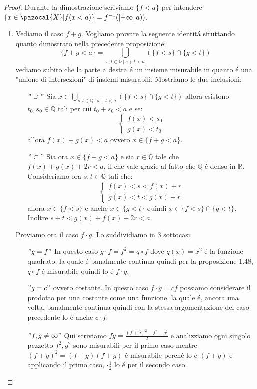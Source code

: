 \documentclass[11pt,a4paper]{report}
\theoremstyle{plain}
\theoremstyle{definition}
\newcommand{\X}{\pazocal{X}}
\begin{document}
\begin{proof}
	Durante la dimostrazione scriviamo $\{f < a\}$ per intendere $\{x \in \X | f(x < a)\} = f^{-1}([-\infty,a))$.
	\begin{enumerate}
		\item Vediamo il caso $f+g$. Vogliamo provare la seguente identit\'a sfruttando quanto dimostrato nella precedente proposizione:
			\[
				\{f + g < a\} = \bigcup\limits_{s,t \in \mathbb{Q}\ |\  s+t < a}(\{f < s\} \cap \{g < t\})			
			\]
		vediamo subito che la parte a destra \'e un insieme misurabile in quanto \'e una "unione di intersezioni" di insiemi misurabili. Mostriamo le due inclusioni:
		\begin{itemize}
			\item[$"\supset"$] Sia $x 	\in \bigcup\limits_{s,t \in \mathbb{Q}\ |\  s+t < a}(\{f < s\} \cap \{g < t\})$ allora esistono $t_0,s_0 \in \mathbb{Q}$ tali per cui $t_0 + s_0 < a$ e se:
			\[
				\begin{cases}
					f(x) < s_0 \\
					g(x) < t_0
				\end{cases}
			\]
			allora $f(x) + g(x) < a$ ovvero $x \in \{f+g < a\}$.
			\item[$"\subset"$] Sia ora $x \in \{f+g < a\}$ e sia $r \in \mathbb{Q}$ tale che $f(x) + g(x) + 2r < a$, il che vale grazie al fatto che $\mathbb{Q}$ \'e denso in $\mathbb{R}$. Consideriamo ora $s,t \in \mathbb{Q}$ tali che:
			\[
				\begin{cases}
					f(x) < s < f(x) + r\\
					g(x) < t < g(x) + r
				\end{cases}			
			\] 
			allora $x \in \{f < s\}$ e anche $x \in \{g < t\}$ quindi $x \in \{f < s\}\cap \{g < t\}$. Inoltre $s+t < g(x) + f(x) +2r < a$.
		\end{itemize}
		Proviamo ora il caso $f\cdot g$. Lo suddividiamo in 3 sottocasi:
			\begin{itemize}
				\item[$"g = f"$] In questo caso $g\cdot f = f^2 = q \circ f$ dove $q(x) = x^2$ \'e la funzione quadrato, la quale \'e banalmente continua quindi per la proposizione 1.48, $q \circ f$ \'e misurabile quindi lo \'e $f\cdot g$.
				\item[$"g = c"$] ovvero costante. In questo caso $f \cdot g = cf$ possiamo considerare il prodotto per una costante come una funzione, la quale \'e, ancora una volta, banalmente continua quindi con la stessa argomentazione del caso precedente lo \'e anche $c\cdot f$.
				\item[$"f,g \ne \infty"$] Qui scriviamo $fg = \frac{(f + g)^2 -f^2 -g^2}{2}$ e analizziamo ogni singolo pezzetto $f^2,g^2$ sono misurabili per il primo caso mentre $(f + g)^2 = (f + g)(f + g)$ \'e misurabile perch\'e lo \'e $(f+g)$ e applicando il primo caso, $\cdot \frac{1}{2}$ lo \'e per il secondo caso.

\end{itemize}
\end{enumerate}
\end{proof}
\end{document}
